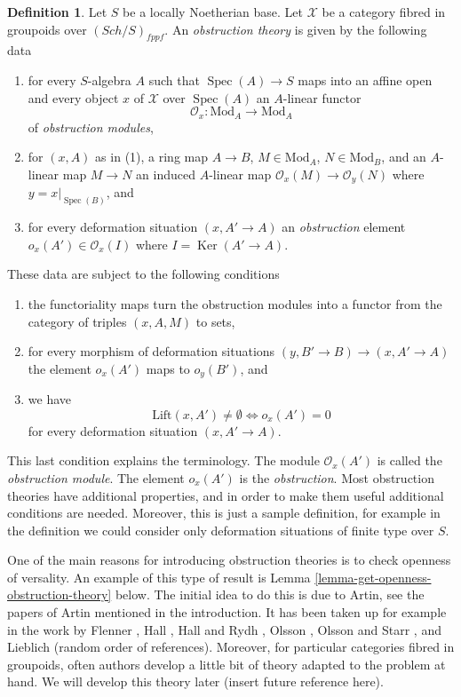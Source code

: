\documentclass{stacks-project}
\theoremstyle{plain}
\theoremstyle{definition}
\newtheorem{definition}[subsection]{Definition}
\theoremstyle{remark}
\numberwithin{equation}{subsection}
\def\Spec{\mathop{\mathrm{Spec}}}
\def\Sch{\mathit{Sch}}
\def\Ker{\mathop{\mathrm{Ker}}}
\begin{document}
\begin{definition}
\label{definition-obstruction-theory}
Let $S$ be a locally Noetherian base. Let $\mathcal{X}$ be a category fibred
in groupoids over $(\Sch/S)_{fppf}$. An {\it obstruction theory} is 
given by the following data
\begin{enumerate}
\item for every $S$-algebra $A$ such that $\Spec(A) \to S$
maps into an affine open and every object $x$ of $\mathcal{X}$ over
$\Spec(A)$ an $A$-linear functor
$$
\mathcal{O}_x : \text{Mod}_A \to \text{Mod}_A
$$
of {\it obstruction modules},
\item for $(x, A)$ as in (1), a ring map $A \to B$,
$M \in \text{Mod}_A$, $N \in \text{Mod}_B$, and an $A$-linear
map $M \to N$ an induced $A$-linear map $\mathcal{O}_x(M) \to \mathcal{O}_y(N)$
where $y = x|_{\Spec(B)}$, and
\item for every deformation situation $(x, A' \to A)$ an
{\it obstruction} element
$o_x(A') \in \mathcal{O}_x(I)$ where $I = \Ker(A' \to A)$.
\end{enumerate}
These data are subject to the following conditions
\begin{enumerate}
\item[(i)] the functoriality maps turn the obstruction modules into a functor
from the category of triples $(x, A, M)$ to sets,
\item[(ii)] for every morphism of deformation situations
$(y, B' \to B) \to (x, A' \to A)$ the element $o_x(A')$ maps
to $o_y(B')$, and
\item[(iii)] we have
$$
\text{Lift}(x, A') \not = \emptyset
\Leftrightarrow
o_x(A') = 0
$$
for every deformation situation $(x, A' \to A)$.
\end{enumerate}
\end{definition}

\noindent
This last condition explains the terminology. The module $\mathcal{O}_x(A')$
is called the {\it obstruction module}. The element $o_x(A')$ is the
{\it obstruction}.
Most obstruction theories have additional properties, and in order to
make them useful additional conditions are needed.
Moreover, this is just a sample definition, for example in the definition
we could consider only deformation situations of finite type over $S$.

\medskip\noindent
One of the main reasons for introducing obstruction theories is to check
openness of versality. An example of this type of result is
Lemma \ref{lemma-get-openness-obstruction-theory} below.
The initial idea to do this is due to Artin, see
the papers of Artin mentioned in the introduction. It has been taken up
for example in the work by Flenner \cite{Flenner},
Hall \cite{Hall-coherent},
Hall and Rydh \cite{rydh_axioms},
Olsson \cite{olsson_deformation},
Olsson and Starr \cite{olsson-starr}, and
Lieblich \cite{lieblich-complexes} (random order of references).
Moreover, for particular categories fibred in groupoids, often
authors develop a little bit of theory adapted to the problem at hand.
We will develop this theory later (insert future reference here).
\end{document}
